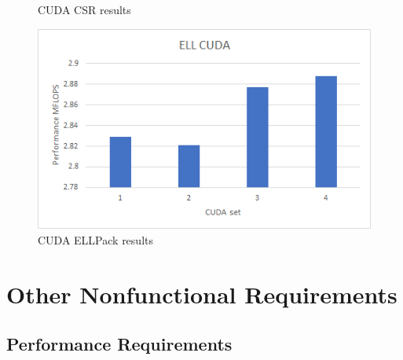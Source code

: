 \documentclass{scrreprt}
\begin{document}
\begin{figure}[ht]
\begin{minipage}[b]{0.5\linewidth}
    \caption{CUDA CSR results} 
    \vspace{4ex}
  \end{minipage}%
  \begin{minipage}[b]{0.5\linewidth}
    \centering
    \includegraphics[width=.9\linewidth]{cavity10ELLCUDA.png} 
    \caption{CUDA ELLPack  results} 
    \vspace{4ex}
  \end{minipage} 
\end{figure}
\FloatBarrier



\chapter{Other Nonfunctional Requirements}

\section{Performance Requirements}
\end{document}

